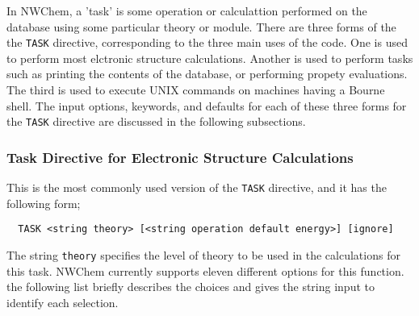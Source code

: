 In NWChem, a 'task' is some operation or calculattion performed on the 
database using some particular theory or module.  There are three forms
of the the \verb+TASK+ directive, corresponding to the three main uses
of the code.  One is used to perform most elctronic structure calculations.
Another is used to perform tasks such as printing the contents of the
database, or performing propety evaluations.  The third is used to
execute UNIX commands on machines having a Bourne shell.  The input options,
keywords, and defaults for each of these three forms for the \verb+TASK+
directive are discussed in the following subsections.

\subsubsection{Task Directive for Electronic Structure Calculations}

This is the most commonly used version of the \verb+TASK+ directive, and
it has the following form;

\begin{verbatim}
  TASK <string theory> [<string operation default energy>] [ignore]
\end{verbatim}

The string \verb+theory+ specifies the level of theory to be used in the
calculations for this task.  NWChem currently supports eleven different
options for this function.  the following list briefly describes the
choices and gives the string input to identify each selection.

